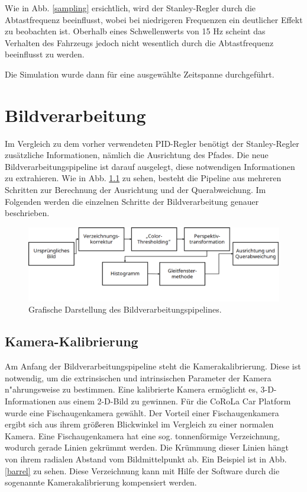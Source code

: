 \documentclass[arbeit=studie,oneside,BCOR=12mm]{ArbeitRST}
\begin{document}
Wie in Abb. \ref{sampling} ersichtlich, wird der Stanley-Regler durch die Abtastfrequenz
beeinflusst, wobei bei niedrigeren Frequenzen ein deutlicher Effekt zu
beobachten ist. Oberhalb eines Schwellenwerts von 15 Hz scheint das
Verhalten des Fahrzeugs jedoch nicht wesentlich durch die Abtastfrequenz
beeinflusst zu werden. 

Die Simulation wurde dann für eine ausgewählte Zeitspanne durchgeführt. 



\chapter{Bildverarbeitung}

Im Vergleich zu dem vorher verwendeten PID-Regler benötigt der
Stanley-Regler zusätzliche Informationen, nämlich die Ausrichtung des Pfades.
Die neue Bildverarbeitungspipeline ist darauf ausgelegt, diese notwendigen
Informationen zu extrahieren. Wie in Abb. \ref{pipeline} zu sehen, besteht die
Pipeline aus mehreren Schritten zur Berechnung der Ausrichtung und der
Querabweichung. Im Folgenden werden die einzelnen Schritte der Bildverarbeitung
genauer beschrieben. \\

\begin{figure}[h]
    \centering
    \includegraphics[scale=0.72]{pipeline}
    \caption{Grafische Darstellung des Bildverarbeitungspipelines.}
    \label{pipeline}
\end{figure}


\section{Kamera-Kalibrierung}

Am Anfang der Bildverarbeitungspipeline steht die Kamerakalibrierung. Diese
ist notwendig, um die extrinsischen und intrinsischen
Parameter der Kamera n"ahrungsweise zu bestimmen. Eine kalibrierte Kamera
ermöglicht es, 3-D-Informationen aus einem 2-D-Bild zu gewinnen. Für die CoRoLa
Car Platform wurde eine Fischaugenkamera gewählt. Der Vorteil einer
Fischaugenkamera ergibt sich aus ihrem größeren Blickwinkel im Vergleich zu
einer normalen Kamera. Eine Fischaugenkamera hat eine sog. \glqq
tonnenförmige Verzeichnung\grqq \cite{wiki-verzei}, wodurch gerade Linien
gekrümmt werden. Die Krümmung dieser Linien hängt von ihrem radialen Abstand
vom Bildmittelpunkt ab. Ein Beispiel ist in Abb. \ref{barrel} zu sehen. Diese
Verzeichnung kann mit Hilfe der Software durch die sogenannte
Kamerakalibrierung kompensiert werden.
\end{document}
